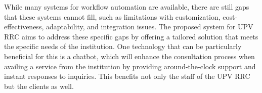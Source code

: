 While many systems for workflow automation are available, there are still gaps that these systems cannot fill, such as limitations with customization, cost-effectiveness, adaptability, and integration issues. The proposed system for UPV RRC aims to address these specific gaps by offering a tailored solution that meets the specific needs of the institution. One technology that can be particularly beneficial for this is a chatbot, which will enhance the consultation process when availing a service from the institution by providing around-the-clock support and instant responses to inquiries. This benefits not only the staff of the UPV RRC but the clients as well.














